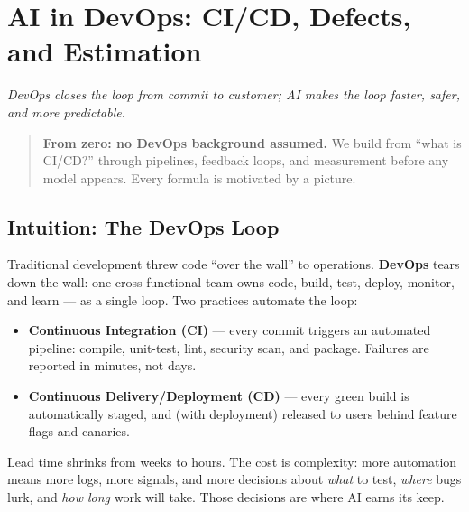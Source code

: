 \chapter{AI in DevOps: CI/CD, Defects, and Estimation}\label{ch:devops}
\begin{center}\small\textit{DevOps closes the loop from commit to customer; AI makes the loop faster, safer, and more predictable.}\end{center}

\begin{quote}\small\textbf{From zero: no DevOps background assumed.} We build from ``what is CI/CD?'' through pipelines, feedback loops, and measurement before any model appears. Every formula is motivated by a picture.\end{quote}

\noindent{}
\vspace{0.4em}

\section{Intuition: The DevOps Loop}\label{sec:devops-intuition}
Traditional development threw code ``over the wall'' to operations. \textbf{DevOps} tears down the wall: one cross-functional team owns code, build, test, deploy, monitor, and learn --- as a single loop. Two practices automate the loop:

\begin{itemize}[leftmargin=1.2em, itemsep=0.3em]
  \item \textbf{Continuous Integration (CI)} --- every commit triggers an automated pipeline: compile, unit-test, lint, security scan, and package. Failures are reported in minutes, not days.
  \item \textbf{Continuous Delivery/Deployment (CD)} --- every green build is automatically staged, and (with deployment) released to users behind feature flags and canaries.
\end{itemize}

Lead time shrinks from weeks to hours. The cost is complexity: more automation means more logs, more signals, and more decisions about \emph{what} to test, \emph{where} bugs lurk, and \emph{how long} work will take. Those decisions are where AI earns its keep.


